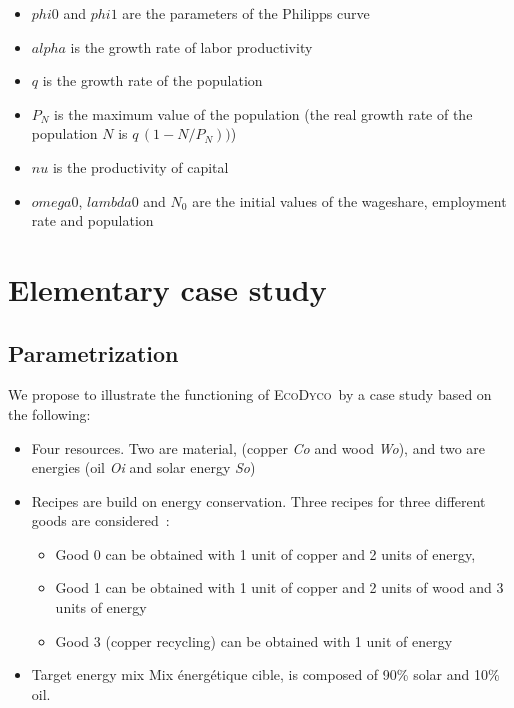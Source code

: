 \documentclass[12pt,a4paper]{article}%
\newcommand{\ed}{\textsc{EcoDyco}}
\begin{document}
\begin{itemize}
	\item $phi0$ and $phi1$ are the parameters of the Philipps curve
	
	\item $alpha$ is the growth rate of labor productivity
	
	\item $q$ is the growth rate of the population
	
	\item $P_{N}$ is the maximum value of the population (the real growth rate of the population $N$ is $q \, (1-N/P_{N}))$)
	
	\item $nu$ is the productivity of capital
	
	\item $omega0$, $lambda0$ and $N_{0}$ are the initial values of the wageshare,
	employment rate and population
\end{itemize}


\section{Elementary case study}

\subsection{Parametrization}

We propose to illustrate the functioning of \ed\ by a case study based on the following:

\begin{itemize}
\item Four resources. Two are material, (copper \textit{Co} and wood \textit{Wo}), and two are energies (oil \textit{Oi} and solar energy \textit{So})

\item  Recipes are build on energy conservation. Three recipes for three different goods are considered~:

	\begin{itemize}
	\item Good 0  can be obtained with 1 unit of copper and 2 units of energy,  
	
	\item Good 1 can be obtained with 1 unit of copper and 2 units of wood and 3 units of energy
	
	\item Good 3 (copper recycling) can be obtained with 1 unit of energy 
	\end{itemize}

\item Target energy mix Mix énergétique cible, is composed of 90\% solar and 10\% oil.
\end{itemize}
\end{document}
